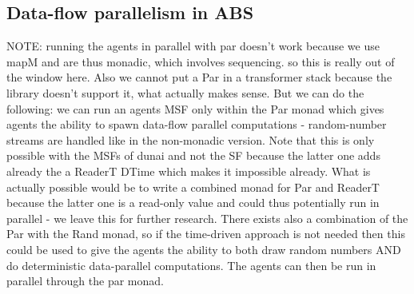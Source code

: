 \subsection{Data-flow parallelism in ABS}
NOTE: running the agents in parallel with par doesn't work because we use mapM and are thus monadic, which involves sequencing. so this is really out of the window here. Also we cannot put a Par in a transformer stack because the library doesn't support it, what actually makes sense. But we can do the following: we can run an agents MSF only within the Par monad which gives agents the ability to spawn data-flow parallel computations - random-number streams are handled like in the non-monadic version. Note that this is only possible with the MSFs of dunai and not the SF because the latter one adds already the a ReaderT DTime which makes it impossible already. 
What is actually possible would be to write a combined monad for Par and ReaderT because the latter one is a read-only value and could thus potentially run in parallel - we leave this for further research. There exists also a combination of the Par with the Rand monad, so if the time-driven approach is not needed then this could be used to give the agents the ability to both draw random numbers AND do deterministic data-parallel computations. The agents can then be run in parallel through the par monad.
